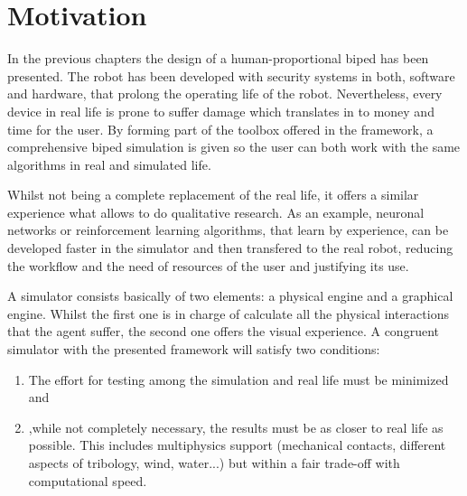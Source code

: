 \section{Motivation} %
\label{sec:sim_motivation}
In the previous chapters the design of a human-proportional biped has been presented. 
The robot has been developed with security systems in both, software and hardware, that prolong the operating life of the robot. 
Nevertheless, every device in real life is prone to suffer damage which translates in to money and time for the user.
By forming part of the toolbox offered in the framework, a comprehensive biped simulation is given so the user can both work with the same algorithms in real and simulated life.

Whilst not being a complete replacement of the real life, it offers a similar experience what allows to do qualitative research.
As an example, neuronal networks or reinforcement learning algorithms, that learn by experience, can be developed faster in the simulator and then transfered to the real robot, reducing the workflow and the need of resources of the user and justifying its use.

A simulator consists basically of two elements: a physical engine and a graphical engine.
Whilst the first one is in charge of calculate all the physical interactions that the agent suffer, the second one offers the visual experience.
A congruent simulator with the presented framework will satisfy two conditions:
\begin{enumerate}
  \item The effort for testing among the simulation and real life must be minimized and
  \item ,while not completely necessary, the results must be as closer to real life as possible. This includes multiphysics support (mechanical contacts, different aspects of tribology, wind, water...) but within a fair trade-off with computational speed.
\end{enumerate}

